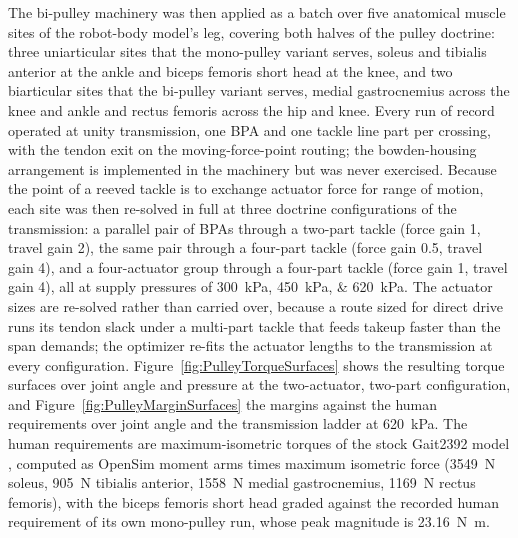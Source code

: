 \documentclass[utf8]{FrontiersinHarvard} %
\begin{document}
The bi-pulley machinery was then applied as a batch over five anatomical muscle sites of the robot-body model's leg, covering both halves of the pulley doctrine: three uniarticular sites that the mono-pulley variant serves, soleus and tibialis anterior at the ankle and biceps femoris short head at the knee, and two biarticular sites that the bi-pulley variant serves, medial gastrocnemius across the knee and ankle and rectus femoris across the hip and knee. Every run of record operated at unity transmission, one BPA and one tackle line part per crossing, with the tendon exit on the moving-force-point routing; the bowden-housing arrangement is implemented in the machinery but was never exercised. Because the point of a reeved tackle is to exchange actuator force for range of motion, each site was then re-solved in full at three doctrine configurations of the transmission: a parallel pair of BPAs through a two-part tackle (force gain 1, travel gain 2), the same pair through a four-part tackle (force gain 0.5, travel gain 4), and a four-actuator group through a four-part tackle (force gain 1, travel gain 4), all at supply pressures of \qtylist{300;450;620}{\kPa}. The actuator sizes are re-solved rather than carried over, because a route sized for direct drive runs its tendon slack under a multi-part tackle that feeds takeup faster than the span demands; the optimizer re-fits the actuator lengths to the transmission at every configuration. Figure~\ref{fig:PulleyTorqueSurfaces} shows the resulting torque surfaces over joint angle and pressure at the two-actuator, two-part configuration, and Figure~\ref{fig:PulleyMarginSurfaces} the margins against the human requirements over joint angle and the transmission ladder at \qty{620}{\kPa}. The human requirements are maximum-isometric torques of the stock Gait2392 model \citep{delp_opensim_2007, seth_opensim_2018}, computed as OpenSim moment arms times maximum isometric force (\qty{3549}{\N} soleus, \qty{905}{\N} tibialis anterior, \qty{1558}{\N} medial gastrocnemius, \qty{1169}{\N} rectus femoris), with the biceps femoris short head graded against the recorded human requirement of its own mono-pulley run, whose peak magnitude is \qty{23.16}{\newton\meter}.
\end{document}
